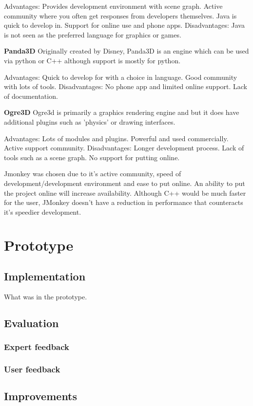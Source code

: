 \documentclass[11pt]{report}
\begin{document}
Advantages: Provides development environment with scene graph. Active community where you often get responses from developers themselves. Java is quick to develop in. Support for online use and phone apps.
Disadvantages: Java is not seen as the preferred language for graphics or games.

\textbf{Panda3D}
Originally created by Disney, Panda3D is an engine which can be used via python or C++ although support is mostly for python.

Advantages: Quick to develop for with a choice in language. Good community with lots of tools.
Disadvantages: No phone app and limited online support. Lack of documentation. 

\textbf{Ogre3D}
Ogre3d is primarily a graphics rendering engine and but it does have additional plugins such as 'physics' or drawing interfaces.

Advantages: Lots of modules and plugins. Powerful and used commercially. Active support community.
Disadvantages: Longer development process. Lack of tools such as a scene graph. No support for putting online.

Jmonkey was chosen due to it's active community, speed of development/development environment and ease to put online. An ability to put the project online will increase availability. Although C++ would be much faster for the user, JMonkey doesn't have a reduction in performance that counteracts it's speedier development. 


\chapter{Prototype}

\section{Implementation}
What was in the prototype.
\section{Evaluation}
\subsection{Expert feedback}
\subsection{User feedback}
\section{Improvements}
\end{document}
